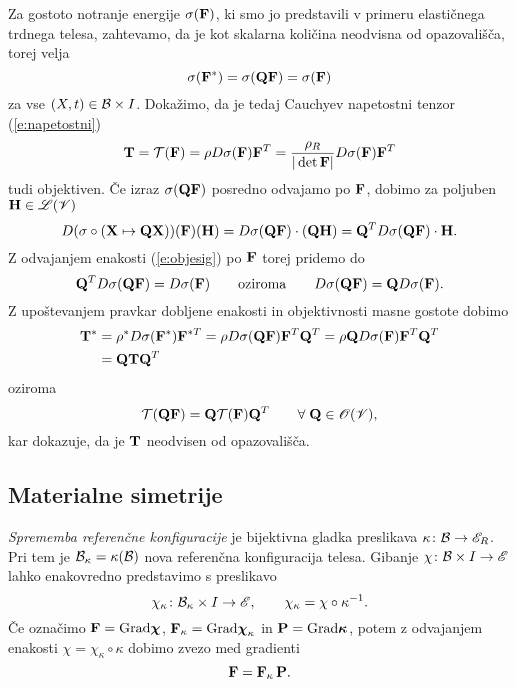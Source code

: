 Za gostoto notranje energije $\sigma(\mathbf F)$, ki smo jo predstavili v primeru
elastičnega trdnega telesa, zahtevamo, da je kot skalarna količina neodvisna
od opazovališča, torej velja
\begin{equation} \label{e:objesig}
	\sigma(\mathbf F^*)=\sigma(\mathbf Q\mathbf F)=\sigma(\mathbf F)
\end{equation}
za vse $(X,t)\in\mathcal B\times I$.
Dokažimo, da je tedaj Cauchyev napetostni tenzor (\ref{e:napetostni})
\[
	\mathbf T=\mathcal{T}(\mathbf F)=\rho D\sigma(\mathbf F)\mathbf F^T
	=\frac{\rho_R}{|\det\mathbf F|} D\sigma(\mathbf F)\mathbf F^T
\]
tudi objektiven. Če izraz $\sigma(\mathbf Q\mathbf F)$ posredno odvajamo po $\mathbf F$,
dobimo za poljuben $\mathbf H\in\mathscr L(\mathscr V)$
\[
	D(\sigma\circ(\mathbf X\mapsto\mathbf Q\mathbf X))(\mathbf F)(\mathbf H)=
	D\sigma(\mathbf Q\mathbf F)\cdot(\mathbf Q\mathbf H)=\mathbf Q^T D\sigma(\mathbf Q\mathbf F)\cdot\mathbf H.
\]
Z odvajanjem enakosti (\ref{e:objesig}) po $\mathbf F$ torej pridemo do
\[
	\mathbf Q^T D\sigma(\mathbf Q\mathbf F) = D\sigma(\mathbf F)\qquad\textrm{oziroma}
	\qquad D\sigma(\mathbf Q\mathbf F) = \mathbf QD\sigma(\mathbf F).
\]
Z upoštevanjem pravkar dobljene enakosti in objektivnosti masne gostote dobimo
\begin{align*}
	\mathbf T^*&=\rho^* D\sigma(\mathbf F^*)\mathbf F^{*T}
	=\rho D\sigma(\mathbf Q\mathbf F)\mathbf F^{T}\mathbf Q^{T}
	=\rho \mathbf Q D\sigma(\mathbf F)\mathbf F^{T}\mathbf Q^{T} \nonumber \\
	&=\mathbf Q\mathbf T\mathbf Q^{T}
\end{align*}
oziroma
\[
	\mathcal{T}(\mathbf Q\mathbf F)=\mathbf Q\mathcal{T}(\mathbf F)\mathbf Q^{T}\qquad\forall\;\mathbf Q\in\mathscr{O}(\mathscr V),
\]
kar dokazuje, da je $\mathbf T$ neodvisen od opazovališča.


\subsection{Materialne simetrije}


\emph{Sprememba referenčne konfiguracije} je bijektivna gladka preslikava $\kappa\colon\mathcal B\to\mathscr E_R$.
Pri tem je $\mathcal B_{\kappa}=\kappa(\mathcal B)$ nova referenčna konfiguracija telesa. Gibanje
$\chi\colon\mathcal B\times I\to\mathscr E$ lahko enakovredno predstavimo s preslikavo
\[
	\chi_{\kappa}\colon\mathcal B_{\kappa}\times I\to\mathscr E, \qquad
	\chi_{\kappa}=\chi\circ\kappa^{-1}.
\]
Če označimo $\mathbf F=\mathrm{Grad}\boldsymbol \chi$, $\mathbf F_{\kappa}=\mathrm{Grad}\boldsymbol \chi_{\kappa}$
in $\mathbf P=\mathrm{Grad}\boldsymbol \kappa$, potem z odvajanjem enakosti $\chi=\chi_{\kappa}\circ\kappa$
dobimo zvezo med gradienti
\[
	\mathbf F=\mathbf F_{\kappa}\,\mathbf P.
\]

